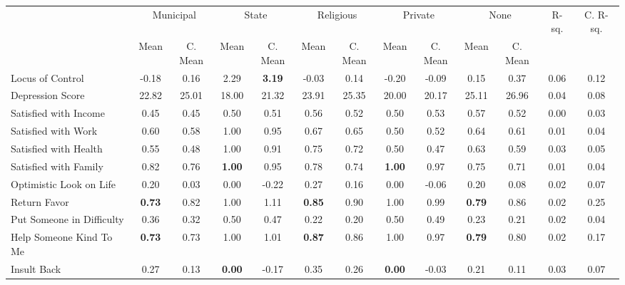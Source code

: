 \begin{tabular}{l c c c c c c c c c c c c}
\toprule
& \multicolumn{2}{c}{Municipal} & \multicolumn{2}{c}{State} & \multicolumn{2}{c}{Religious} & \multicolumn{2}{c}{Private} & \multicolumn{2}{c}{None} & R-sq. & C. R-sq. \\
& \scriptsize Mean & \scriptsize C. Mean & \scriptsize Mean & \scriptsize C. Mean & \scriptsize Mean & \scriptsize C. Mean & \scriptsize Mean & \scriptsize C. Mean & \scriptsize Mean & \scriptsize C. Mean & & \\
\midrule
Locus of Control &     -0.18 & 0.16 &      2.29 & \textbf{     3.19} &     -0.03 & 0.14 &     -0.20 & -0.09 &      0.15 & 0.37 &      0.06 &      0.12 \\
Depression Score &     22.82 & 25.01 &     18.00 & 21.32 &     23.91 & 25.35 &     20.00 & 20.17 &     25.11 & 26.96 &      0.04 &      0.08 \\
Satisfied with Income &      0.45 & 0.45 &      0.50 & 0.51 &      0.56 & 0.52 &      0.50 & 0.53 &      0.57 & 0.52 &      0.00 &      0.03 \\
Satisfied with Work &      0.60 & 0.58 &      1.00 & 0.95 &      0.67 & 0.65 &      0.50 & 0.52 &      0.64 & 0.61 &      0.01 &      0.04 \\
Satisfied with Health &      0.55 & 0.48 &      1.00 & 0.91 &      0.75 & 0.72 &      0.50 & 0.47 &      0.63 & 0.59 &      0.03 &      0.05 \\
Satisfied with Family &      0.82 & 0.76 & \textbf{     1.00} & 0.95 &      0.78 & 0.74 & \textbf{     1.00} & 0.97 &      0.75 & 0.71 &      0.01 &      0.04 \\
Optimistic Look on Life &      0.20 & 0.03 &      0.00 & -0.22 &      0.27 & 0.16 &      0.00 & -0.06 &      0.20 & 0.08 &      0.02 &      0.07 \\
Return Favor & \textbf{     0.73} & 0.82 &      1.00 & 1.11 & \textbf{     0.85} & 0.90 &      1.00 & 0.99 & \textbf{     0.79} & 0.86 &      0.02 &      0.25 \\
Put Someone in Difficulty &      0.36 & 0.32 &      0.50 & 0.47 &      0.22 & 0.20 &      0.50 & 0.49 &      0.23 & 0.21 &      0.02 &      0.04 \\
Help Someone Kind To Me & \textbf{     0.73} & 0.73 &      1.00 & 1.01 & \textbf{     0.87} & 0.86 &      1.00 & 0.97 & \textbf{     0.79} & 0.80 &      0.02 &      0.17 \\
Insult Back &      0.27 & 0.13 & \textbf{     0.00} & -0.17 &      0.35 & 0.26 & \textbf{     0.00} & -0.03 &      0.21 & 0.11 &      0.03 &      0.07 \\
\bottomrule
\end{tabular}

